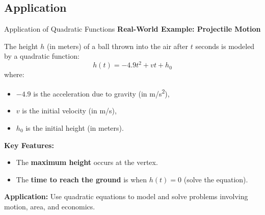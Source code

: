 \documentclass{beamer}
\begin{document}
\begin{frame}
\section{Application}
\end{frame}


\begin{frame}{Application of Quadratic Functions}
\textbf{Real-World Example: Projectile Motion}

\vspace{0.2cm}
The height $h$ (in meters) of a ball thrown into the air after $t$ seconds is modeled by a quadratic function:
\[
h(t) = -4.9t^2 + vt + h_0
\]
where:
\begin{itemize}
    \item $-4.9$ is the acceleration due to gravity (in m/s\textsuperscript{2}),
    \item $v$ is the initial velocity (in m/s),
    \item $h_0$ is the initial height (in meters).
\end{itemize}

\vspace{0.3cm}
\textbf{Key Features:}
\begin{itemize}
    \item The \textbf{maximum height} occurs at the vertex.
    \item The \textbf{time to reach the ground} is when $h(t) = 0$ (solve the equation).
\end{itemize}

\vspace{0.3cm}
\textbf{Application:} Use quadratic equations to model and solve problems involving motion, area, and economics.
\end{frame}
\end{document}
